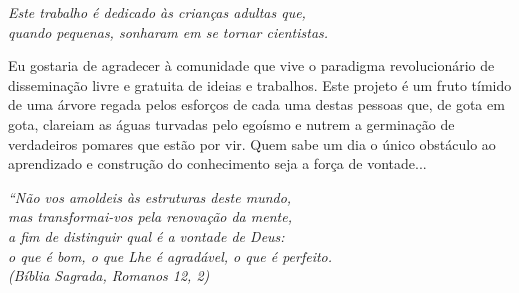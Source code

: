 \documentclass[
  	11pt,%
 	openright,%
 	twoside,%
 	a4paper,%
 	english,%
 	brazil %
 	]{abntex2}
\begin{document}
\frenchspacing 

\imprimircapa

\imprimirfolhaderosto*

% 

%
% 
%

\begin{dedicatoria}
   \vspace*{\fill}
   \centering
   \noindent
   \textit{ Este trabalho é dedicado às crianças adultas que,\\
   quando pequenas, sonharam em se tornar cientistas.} \vspace*{\fill}
\end{dedicatoria}

\begin{agradecimentos}
Eu gostaria de agradecer à comunidade que vive o paradigma revolucionário de disseminação livre e gratuita de ideias e trabalhos.
Este projeto é um fruto tímido de uma árvore regada pelos esforços de cada uma destas pessoas que, de gota em gota, clareiam as águas 
turvadas pelo egoísmo e nutrem a germinação de verdadeiros pomares que estão por vir. Quem sabe um dia o único obstáculo ao aprendizado e construção 
do conhecimento seja a força de vontade...
\end{agradecimentos}

\begin{epigrafe}
    \vspace*{\fill}
	\begin{flushright}
		\textit{``Não vos amoldeis às estruturas deste mundo, \\
		mas transformai-vos pela renovação da mente, \\
		a fim de distinguir qual é a vontade de Deus: \\
		o que é bom, o que Lhe é agradável, o que é perfeito.\\
		(Bíblia Sagrada, Romanos 12, 2)}
	\end{flushright}
\end{epigrafe}
\end{document}
